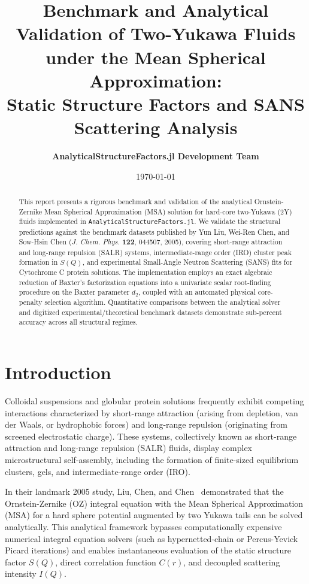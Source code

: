 \documentclass[11pt,a4paper]{article}
\title{\textbf{Benchmark and Analytical Validation of Two-Yukawa Fluids under the Mean Spherical Approximation:\\Static Structure Factors and SANS Scattering Analysis}}
\author{\textbf{AnalyticalStructureFactors.jl Development Team}}
\date{\today}
\begin{document}
\maketitle

\begin{abstract}
This report presents a rigorous benchmark and validation of the analytical Ornstein-Zernike Mean Spherical Approximation (MSA) solution for hard-core two-Yukawa (2Y) fluids implemented in \texttt{AnalyticalStructureFactors.jl}. We validate the structural predictions against the benchmark datasets published by Yun Liu, Wei-Ren Chen, and Sow-Hsin Chen (\textit{J. Chem. Phys.} \textbf{122}, 044507, 2005), covering short-range attraction and long-range repulsion (SALR) systems, intermediate-range order (IRO) cluster peak formation in $S(Q)$, and experimental Small-Angle Neutron Scattering (SANS) fits for Cytochrome C protein solutions. The implementation employs an exact algebraic reduction of Baxter's factorization equations into a univariate scalar root-finding procedure on the Baxter parameter $d_2$, coupled with an automated physical core-penalty selection algorithm. Quantitative comparisons between the analytical solver and digitized experimental/theoretical benchmark datasets demonstrate sub-percent accuracy across all structural regimes.
\end{abstract}

\section{Introduction}

Colloidal suspensions and globular protein solutions frequently exhibit competing interactions characterized by short-range attraction (arising from depletion, van der Waals, or hydrophobic forces) and long-range repulsion (originating from screened electrostatic charge). These systems, collectively known as short-range attraction and long-range repulsion (SALR) fluids, display complex microstructural self-assembly, including the formation of finite-sized equilibrium clusters, gels, and intermediate-range order (IRO).

In their landmark 2005 study, Liu, Chen, and Chen~\cite{liu2005cluster} demonstrated that the Ornstein-Zernike (OZ) integral equation with the Mean Spherical Approximation (MSA) for a hard sphere potential augmented by two Yukawa tails can be solved analytically. This analytical framework bypasses computationally expensive numerical integral equation solvers (such as hypernetted-chain or Percus-Yevick Picard iterations) and enables instantaneous evaluation of the static structure factor $S(Q)$, direct correlation function $C(r)$, and decoupled scattering intensity $I(Q)$.
\end{document}
